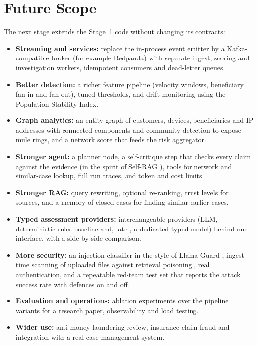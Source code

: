 \documentclass[oneside,a4paper,12pt]{report}
\begin{document}
\section{Future Scope}
The next stage extends the Stage~1 code without changing its contracts:
\begin{itemize}
  \item \textbf{Streaming and services:} replace the in-process event emitter by a Kafka-compatible broker (for example Redpanda) with separate ingest, scoring and investigation workers, idempotent consumers and dead-letter queues.
  \item \textbf{Better detection:} a richer feature pipeline (velocity windows, beneficiary fan-in and fan-out), tuned thresholds, and drift monitoring using the Population Stability Index.
  \item \textbf{Graph analytics:} an entity graph of customers, devices, beneficiaries and IP addresses with connected components and community detection to expose mule rings, and a network score that feeds the risk aggregator.
  \item \textbf{Stronger agent:} a planner node, a self-critique step that checks every claim against the evidence (in the spirit of Self-RAG \cite{asai2024selfrag}), tools for network and similar-case lookup, full run traces, and token and cost limits.
  \item \textbf{Stronger RAG:} query rewriting, optional re-ranking, trust levels for sources, and a memory of closed cases for finding similar earlier cases.
  \item \textbf{Typed assessment providers:} interchangeable providers (LLM, deterministic rules baseline and, later, a dedicated typed model) behind one interface, with a side-by-side comparison.
  \item \textbf{More security:} an injection classifier in the style of Llama Guard \cite{inan2023llamaguard}, ingest-time scanning of uploaded files against retrieval poisoning \cite{zou2025poisonedrag}, real authentication, and a repeatable red-team test set that reports the attack success rate with defences on and off.
  \item \textbf{Evaluation and operations:} ablation experiments over the pipeline variants for a research paper, observability and load testing.
  \item \textbf{Wider use:} anti-money-laundering review, insurance-claim fraud and integration with a real case-management system.
\end{itemize}
\end{document}
